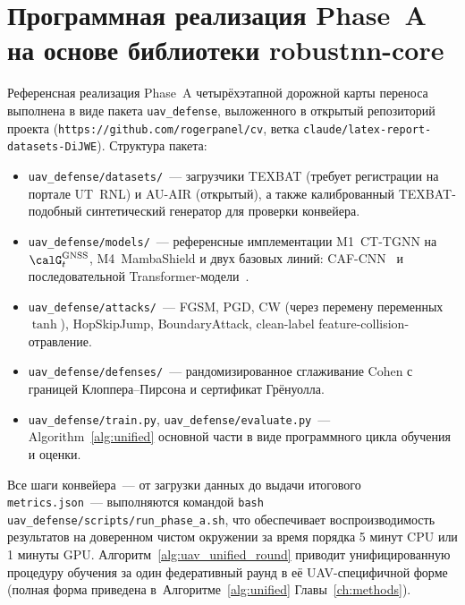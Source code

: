 \section{Программная реализация Phase~A на основе библиотеки
\textsf{robustnn-core}}
\label{sec:uav_phase_a}
Референсная реализация Phase~A четырёхэтапной дорожной карты
переноса выполнена в виде пакета \texttt{uav\_defense}, выложенного в
открытый репозиторий проекта (\texttt{https://github.com/rogerpanel/cv},
ветка \texttt{claude/latex-report-datasets-DiJWE}). Структура пакета:
\begin{itemize}\setlength\itemsep{0.1em}
\item \texttt{uav\_defense/datasets/}~--- загрузчики TEXBAT (требует
регистрации на портале UT~RNL) и AU-AIR (открытый), а также калиброванный
TEXBAT-подобный синтетический генератор для проверки конвейера.
\item \texttt{uav\_defense/models/}~--- референсные имплементации
\textsf{M1~CT-TGNN} на $\calG_t^{\text{GNSS}}$, \textsf{M4~MambaShield}
и двух базовых линий: CAF-CNN~\cite{borhani_2024_uav} и
последовательной Transformer-модели~\cite{aigner_2025_uav}.
\item \texttt{uav\_defense/attacks/}~--- FGSM, PGD, CW
(через перемену переменных $\tanh$), HopSkipJump, BoundaryAttack,
clean-label feature-collision-отравление.
\item \texttt{uav\_defense/defenses/}~--- рандомизированное сглаживание
Cohen с границей Клоппера--Пирсона и сертификат Грёнуолла.
\item \texttt{uav\_defense/train.py},
\texttt{uav\_defense/evaluate.py}~--- Algorithm~\ref{alg:unified}
основной части в виде программного цикла обучения и оценки.
\end{itemize}
Все шаги конвейера~--- от загрузки данных до выдачи итогового
\texttt{metrics.json}~--- выполняются командой
\texttt{bash uav\_defense/scripts/run\_phase\_a.sh}, что обеспечивает
воспроизводимость результатов на доверенном чистом окружении за время
порядка 5 минут CPU или 1 минуты GPU.
Алгоритм~\ref{alg:uav_unified_round} приводит унифицированную процедуру
обучения за один федеративный раунд в её UAV-специфичной форме (полная
форма приведена в~Алгоритме~\ref{alg:unified} Главы~\ref{ch:methods}).
